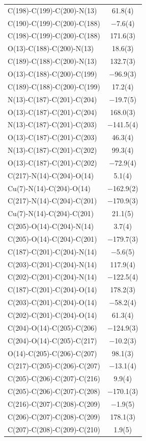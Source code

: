 \begin{center}
{\begin{supertabular}{p{1.8in}c}
C(198)-C(199)-C(200)-N(13)&61.8(4)\\
C(190)-C(199)-C(200)-C(188)&$-$7.6(4)\\
C(198)-C(199)-C(200)-C(188)&171.6(3)\\
O(13)-C(188)-C(200)-N(13)&18.6(3)\\
C(189)-C(188)-C(200)-N(13)&132.7(3)\\
O(13)-C(188)-C(200)-C(199)&$-$96.9(3)\\
C(189)-C(188)-C(200)-C(199)&17.2(4)\\
N(13)-C(187)-C(201)-C(204)&$-$19.7(5)\\
O(13)-C(187)-C(201)-C(204)&168.0(3)\\
N(13)-C(187)-C(201)-C(203)&$-$141.5(4)\\
O(13)-C(187)-C(201)-C(203)&46.3(4)\\
N(13)-C(187)-C(201)-C(202)&99.3(4)\\
O(13)-C(187)-C(201)-C(202)&$-$72.9(4)\\
C(217)-N(14)-C(204)-O(14)&5.1(4)\\
Cu(7)-N(14)-C(204)-O(14)&$-$162.9(2)\\
C(217)-N(14)-C(204)-C(201)&$-$170.9(3)\\
Cu(7)-N(14)-C(204)-C(201)&21.1(5)\\
C(205)-O(14)-C(204)-N(14)&3.7(4)\\
C(205)-O(14)-C(204)-C(201)&$-$179.7(3)\\
C(187)-C(201)-C(204)-N(14)&$-$5.6(5)\\
C(203)-C(201)-C(204)-N(14)&117.9(4)\\
C(202)-C(201)-C(204)-N(14)&$-$122.5(4)\\
C(187)-C(201)-C(204)-O(14)&178.2(3)\\
C(203)-C(201)-C(204)-O(14)&$-$58.2(4)\\
C(202)-C(201)-C(204)-O(14)&61.3(4)\\
C(204)-O(14)-C(205)-C(206)&$-$124.9(3)\\
C(204)-O(14)-C(205)-C(217)&$-$10.2(3)\\
O(14)-C(205)-C(206)-C(207)&98.1(3)\\
C(217)-C(205)-C(206)-C(207)&$-$13.1(4)\\
C(205)-C(206)-C(207)-C(216)&9.9(4)\\
C(205)-C(206)-C(207)-C(208)&$-$170.1(3)\\
C(216)-C(207)-C(208)-C(209)&$-$1.9(5)\\
C(206)-C(207)-C(208)-C(209)&178.1(3)\\
C(207)-C(208)-C(209)-C(210)&1.9(5)\\

\end{supertabular}}
\end{center}
